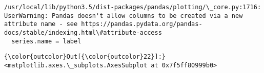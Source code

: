 \documentclass[11pt]{article}
\begin{document}
    \begin{Verbatim}[commandchars=\\\{\}]
/usr/local/lib/python3.5/dist-packages/pandas/plotting/\_core.py:1716: UserWarning: Pandas doesn't allow columns to be created via a new attribute name - see https://pandas.pydata.org/pandas-docs/stable/indexing.html\#attribute-access
  series.name = label

    \end{Verbatim}

\begin{Verbatim}[commandchars=\\\{\}]
{\color{outcolor}Out[{\color{outcolor}22}]:} <matplotlib.axes.\_subplots.AxesSubplot at 0x7f5ff80999b0>
\end{Verbatim}
            
    \begin{center}
    \end{center}
    { \hspace*{\fill} \\}
    

    
    
    
    
\end{document}
